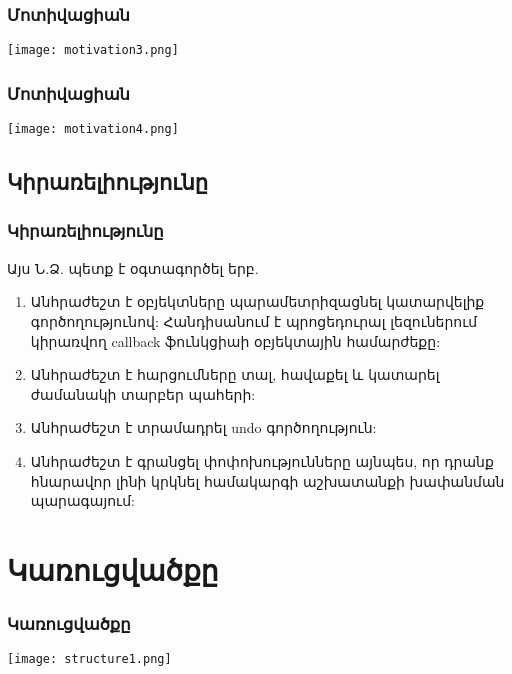 \documentclass{beamer}
\begin{document}
\begin{frame}\frametitle{Մոտիվացիան}
\begin{center}
    \texttt{[image: motivation3.png]}
\end{center}
\end{frame}

\begin{frame}\frametitle{Մոտիվացիան}
\begin{center}
    \texttt{[image: motivation4.png]}
\end{center}
\end{frame}

\subsection{Կիրառելիությունը}
\begin{frame}\frametitle{Կիրառելիությունը}
Այս Ն.Ձ. պետք է օգտագործել երբ.
\vfill
\begin{enumerate}
    \scriptsize
    \item Անհրաժեշտ է օբյեկտները պարամետրիզացնել կատարվելիք գործողությունով:
    Հանդիսանում է պրոցեդուրալ լեզուներում կիրառվող callback ֆունկցիաի օբյեկտային
    համարժեքը: \pause \vfill
    \item Անհրաժեշտ է հարցումները տալ, հավաքել և կատարել ժամանակի տարբեր
    պահերի: \pause \vfill
    \item Անհրաժեշտ է տրամադրել undo գործողություն: \pause \vfill
    \item Անհրաժեշտ է գրանցել փոփոխությունները այնպես, որ դրանք հնարավոր լինի
    կրկնել համակարգի աշխատանքի խափանման պարագայում:
\end{enumerate}
\end{frame}

\section{Կառուցվածքը}
\begin{frame}\frametitle{Կառուցվածքը}
\begin{center}
    \texttt{[image: structure1.png]}
\end{center}
\end{frame}
\end{document}
